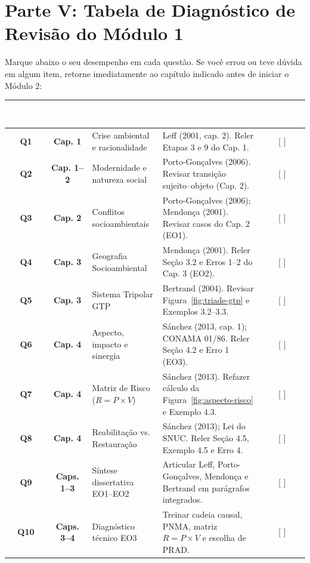 \section*{Parte V: Tabela de Diagnóstico de Revisão do Módulo 1}

Marque abaixo o seu desempenho em cada questão. Se você errou ou teve dúvida em algum item, retorne imediatamente ao capítulo indicado antes de iniciar o Módulo 2:

\begin{center}
\renewcommand{\arraystretch}{1.22}
\small
\begin{tabularx}{\textwidth}{@{}c c p{3.8cm} >{\raggedright\arraybackslash}X c@{}}
  \toprule
  \rowcolor{uefsNavy}
  \textcolor{white}{\bfseries Questão} & \textcolor{white}{\bfseries Revisar} & \textcolor{white}{\bfseries Tema Central} & \textcolor{white}{\bfseries Referência-Base e Ação Recomendada} & \textcolor{white}{\bfseries Acertou?} \\
  \midrule
  \textbf{Q1} & \textbf{Cap. 1} & Crise ambiental e racionalidade & Leff (2001, cap. 2). Reler Etapas 3 e 9 do Cap. 1. & [ \quad ] \\
  \rowcolor{bgGray}
  \textbf{Q2} & \textbf{Cap. 1--2} & Modernidade e natureza social & Porto-Gonçalves (2006). Revisar transição sujeito--objeto (Cap. 2). & [ \quad ] \\
  \textbf{Q3} & \textbf{Cap. 2} & Conflitos socioambientais & Porto-Gonçalves (2006); Mendonça (2001). Revisar casos do Cap. 2 (EO1). & [ \quad ] \\
  \rowcolor{bgGray}
  \textbf{Q4} & \textbf{Cap. 3} & Geografia Socioambiental & Mendonça (2001). Reler Seção 3.2 e Erros 1--2 do Cap. 3 (EO2). & [ \quad ] \\
  \textbf{Q5} & \textbf{Cap. 3} & Sistema Tripolar GTP & Bertrand (2004). Revisar Figura~\ref{fig:triade-gtp} e Exemplos 3.2--3.3. & [ \quad ] \\
  \rowcolor{bgGray}
  \textbf{Q6} & \textbf{Cap. 4} & Aspecto, impacto e sinergia & Sánchez (2013, cap. 1); CONAMA 01/86. Reler Seção 4.2 e Erro 1 (EO3). & [ \quad ] \\
  \textbf{Q7} & \textbf{Cap. 4} & Matriz de Risco ($R = P \times V$) & Sánchez (2013). Refazer cálculo da Figura~\ref{fig:aspecto-risco} e Exemplo 4.3. & [ \quad ] \\
  \rowcolor{bgGray}
  \textbf{Q8} & \textbf{Cap. 4} & Reabilitação vs. Restauração & Sánchez (2013); Lei do SNUC. Reler Seção 4.5, Exemplo 4.5 e Erro 4. & [ \quad ] \\
  \textbf{Q9} & \textbf{Caps. 1--3} & Síntese dissertativa EO1--EO2 & Articular Leff, Porto-Gonçalves, Mendonça e Bertrand em parágrafos integrados. & [ \quad ] \\
  \rowcolor{bgGray}
  \textbf{Q10} & \textbf{Caps. 3--4} & Diagnóstico técnico EO3 & Treinar cadeia causal, PNMA, matriz $R = P \times V$ e escolha de PRAD. & [ \quad ] \\
  \bottomrule
\end{tabularx}
\end{center}
